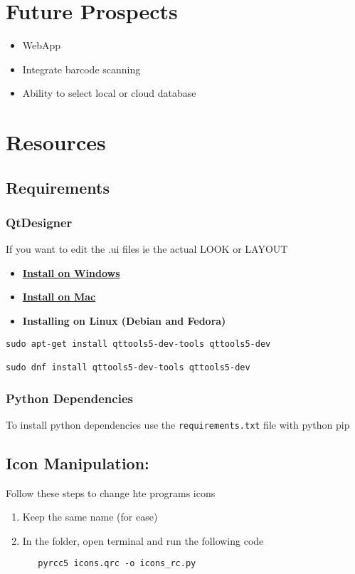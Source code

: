 \documentclass[11pt]{article}
\begin{document}
\section{Future Prospects}
\label{sec:org5002023}
\begin{itemize}
\item WebApp
\item Integrate barcode scanning
\item Ability to select local or cloud database
\end{itemize}

\section{Resources}
\label{sec:orgf0c1647}
\subsection{Requirements}
\label{sec:orgbeb5504}

\subsubsection{QtDesigner}
\label{sec:orgec9a439}
If you want to edit the .ui files ie the actual LOOK or LAYOUT
\begin{itemize}
\item \href{https://build-system.fman.io/static/public/files/Qt\%20Designer\%20Setup.exe}{\textbf{\textbf{Install on Windows}}}
\item \href{https://build-system.fman.io/static/public/files/Qt\%20Designer.dmg}{\textbf{\textbf{Install on Mac}}}
\item \textbf{\textbf{Installing on Linux (Debian and Fedora)}}
\end{itemize}
\begin{verbatim}
sudo apt-get install qttools5-dev-tools qttools5-dev

sudo dnf install qttools5-dev-tools qttools5-dev
\end{verbatim}

\subsubsection{Python Dependencies}
\label{sec:org00694f9}
To install python dependencies use the \texttt{requirements.txt} file with python pip

\subsection{Icon Manipulation:}
\label{sec:orgce07cb3}
Follow these steps to change hte programs icons
\begin{enumerate}
\item Keep the same name (for ease)
\item In the folder, open terminal and run the following code
\begin{verbatim}
   pyrcc5 icons.qrc -o icons_rc.py
\end{verbatim}
\end{enumerate}
\end{document}
